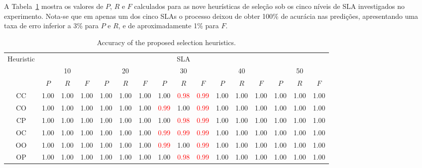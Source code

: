 \documentclass[10pt,conference,compsocconf]{IEEEtran}
\begin{document}
A Tabela~\ref{tab:accuracy} mostra os valores de $P$, $R$ e $F$ calculados para as nove heurísticas de seleção sob os cinco níveis de SLA investigados no experimento. Nota-se que em apenas um dos cinco SLAs o processo deixou de obter 100\% de acurácia nas predições, apresentando uma taxa de erro inferior a 3\% para $P$ e $R$, e de aproximadamente 1\% para $F$.  


\begin{table}[t]
\setlength{\tabcolsep}{1.2pt}
   \centering%
   \caption{\label{tab:accuracy}Accuracy of the proposed selection heuristics.}
    \begin{tabular}{|c|*{5}{ccc|}}
    \hline
     \multirow{3}{*}{Heuristic} & \multicolumn{15}{c|}{SLA} \\
    \cline{2-16}
            & \multicolumn{3}{c|}{10} & \multicolumn{3}{c|}{20} & \multicolumn{3}{c|}{30} & \multicolumn{3}{c|}{40} & \multicolumn{3}{c|}{50} \\
          \cline{2-16}
             & $P$     & $R$     & $F$     & $P$     & $R$     & $F$     & $P$     & $R$     & $F$     & $P$     & $R$  & $F$     & $P$     & $R$     & $F$ \\%
          \hline
    CC    & 1.00  & 1.00  & 1.00  & 1.00  & 1.00  & 1.00  & 1.00  & \textcolor{red}{0.98}  & \textcolor{red}{0.99}  & 1.00  & 1.00  & 1.00  & 1.00  & 1.00  & 1.00 \\
    CO    & 1.00  & 1.00  & 1.00  & 1.00  & 1.00  & 1.00  & \textcolor{red}{0.99}  & 1.00  & \textcolor{red}{0.99}  & 1.00  & 1.00  & 1.00  & 1.00  & 1.00  & 1.00 \\
    CP    & 1.00  & 1.00  & 1.00  & 1.00  & 1.00  & 1.00  & 1.00  & \textcolor{red}{0.98}  & \textcolor{red}{0.99}  & 1.00  & 1.00  & 1.00  & 1.00  & 1.00  & 1.00 \\
    OC    & 1.00  & 1.00  & 1.00  & 1.00  & 1.00  & 1.00  & \textcolor{red}{0.99}  & \textcolor{red}{0.99}  & \textcolor{red}{0.99}  & 1.00  & 1.00  & 1.00  & 1.00  & 1.00  & 1.00 \\
    OO    & 1.00  & 1.00  & 1.00  & 1.00  & 1.00  & 1.00  & \textcolor{red}{0.99}  & 1.00  & \textcolor{red}{0.99}  & 1.00  & 1.00  & 1.00  & 1.00  & 1.00  & 1.00 \\
    OP    & 1.00  & 1.00  & 1.00  & 1.00  & 1.00  & 1.00  & 1.00  & \textcolor{red}{0.98}  & \textcolor{red}{0.99}  & 1.00  & 1.00  & 1.00  & 1.00  & 1.00  & 1.00 \\

\end{tabular}
\end{table}
\end{document}

